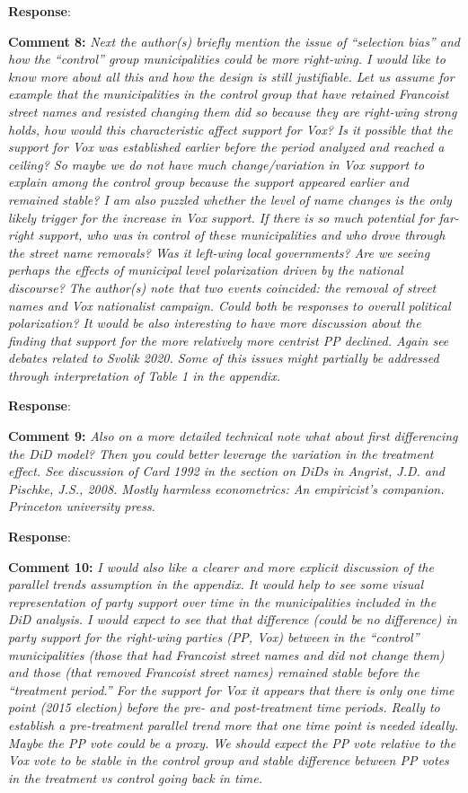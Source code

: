 \documentclass[12pt, a4paper, notitlepage]{article}
\begin{document}
\textbf{Response}: {\color{red}{pending}}

\textbf{Comment 8:} \textit{Next the author(s) briefly mention the issue of “selection bias” and how the “control” group municipalities could be more right-wing. I would like to know more about all this and how the design is still justifiable.  Let us assume for example that the municipalities in the control group that have retained Francoist street names and resisted changing them did so because they are right-wing strong holds, how would this characteristic affect support for Vox? Is it possible that the support for Vox was established earlier before the period analyzed and reached a ceiling? So maybe we do not have much change/variation in Vox support to explain among the control group because the support appeared earlier and remained stable? I am also puzzled whether the level of name changes is the only likely trigger for the increase in Vox support. If there is so much potential for far-right support, who was in control of these municipalities and who drove through the street name removals? Was it left-wing local governments? Are we seeing perhaps the effects of municipal level polarization driven by the national discourse? The author(s) note that two events coincided: the removal of street names and Vox nationalist campaign.  Could both be responses to overall political polarization? It would be also interesting to have more discussion about the finding that support for the more relatively more centrist PP declined. Again see debates related to Svolik 2020. Some of this issues might partially be addressed through interpretation of Table 1 in the appendix.}

\textbf{Response}: {\color{red}{pending}}

\textbf{Comment 9:} \textit{Also on a more detailed technical note what about first differencing the DiD model? Then you could better leverage the variation in the treatment effect. See discussion of Card 1992 in the section on DiDs in Angrist, J.D. and Pischke, J.S., 2008. Mostly harmless econometrics: An empiricist's companion. Princeton university press.}

\textbf{Response}: {\color{red}{pending}}

\textbf{Comment 10:} \textit{I would also like a clearer and more explicit discussion of the parallel trends assumption in the appendix. It would help to see some visual representation of party support over time in the municipalities included in the DiD analysis. I would expect to see that that difference (could be no difference) in party support for the right-wing parties (PP, Vox) between in the “control” municipalities (those that had Francoist street names and did not change them) and those (that removed Francoist street names) remained stable before the “treatment period.” For the support for Vox it appears that there is only one time point (2015 election) before the pre- and post-treatment time periods. Really to establish a pre-treatment parallel trend more that one time point is needed ideally. Maybe the PP vote could be a proxy. We should expect the PP vote relative to the Vox vote to be stable in the control group and stable difference between PP votes in the treatment vs control going back in time.}
\end{document}
